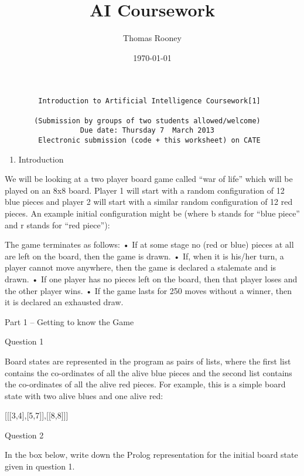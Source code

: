 \documentclass[a4wide, 11pt]{article}
\begin{document}
\title{AI Coursework}
\author{Thomas Rooney}
\date{\today}
\maketitle

\begin{verbatim}
        Introduction to Artificial Intelligence Coursework[1]

       (Submission by groups of two students allowed/welcome)
                  Due date: Thursday 7  March 2013
        Electronic submission (code + this worksheet) on CATE
\end{verbatim}

\begin{enumerate}
\item  Introduction
\end{enumerate}

We will be looking at a two player board game called ``war of life''
which will be played on an 8x8 board. Player 1 will start with a random
configuration of 12 blue pieces and player 2 will start with a similar
random configuration of 12 red pieces. An example initial configuration
might be (where b stands for ``blue piece'' and r stands for ``red
piece''):

\textbar{} \textbar{} The game terminates as follows: • If at some stage
no (red or blue) pieces at all are left on the board, then the game is
drawn. • If, when it is his/her turn, a player cannot move anywhere,
then the game is declared a stalemate and is drawn. • If one player has
no pieces left on the board, then that player loses and the other player
wins. • If the game lasts for 250 moves without a winner, then it is
declared an exhausted draw.

Part 1 -- Getting to know the Game

Question 1

\textbar{} \textbar{}

Board states are represented in the program as pairs of lists, where the
first list contains the co-ordinates of all the alive blue pieces and
the second list contains the co-ordinates of all the alive red pieces.
For example, this is a simple board state with two alive blues and one
alive red:

{[}{[}{[}3,4{]},{[}5,7{]}{]},{[}{[}8,8{]}{]}{]}

Question 2

In the box below, write down the Prolog representation for the initial
board state given in question 1.
\end{document}
